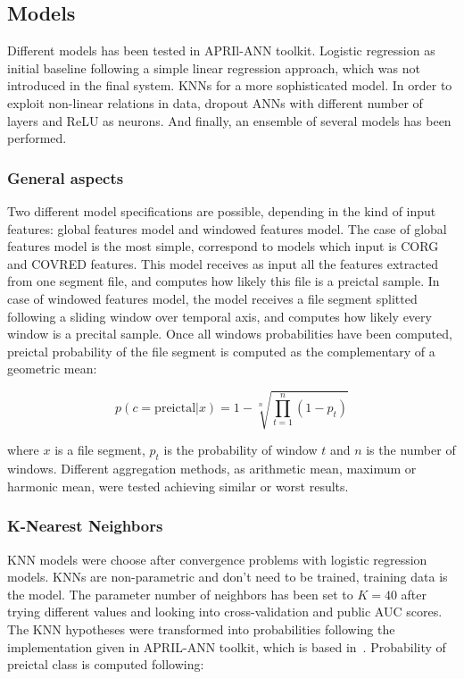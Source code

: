 \documentclass[a4paper,english,twoside]{article}
\begin{document}
\subsection{Models}\label{models}

Different models has been tested in APRIl-ANN toolkit. Logistic regression as
initial baseline following a simple linear regression approach, which was not
introduced in the final system. KNNs for a more sophisticated model. In order to
exploit non-linear relations in data, dropout ANNs with different number of
layers and ReLU as neurons. And finally, an ensemble of several models has been
performed.

\subsubsection{General aspects}

Two different model specifications are possible, depending in the kind of input
features: global features model and windowed features model. The case of global
features model is the most simple, correspond to models which input is CORG and
COVRED features. This model receives as input all the features extracted from
one segment file, and computes how likely this file is a preictal sample. In
case of windowed features model, the model receives a file segment splitted
following a sliding window over temporal axis, and computes how likely every
window is a precital sample. Once all windows probabilities have been computed,
preictal probability of the file segment is computed as the complementary of a
geometric mean:

\begin{equation}
p(c=\text{preictal} | x) = 1 - \sqrt[n]{\prod_{t=1}^n (1 - p_t)}
\label{eq:gmean}
\end{equation}

\noindent where $x$ is a file segment, $p_t$ is the probability of window $t$
and $n$ is the number of windows. Different aggregation methods, as arithmetic
mean, maximum or harmonic mean, were tested achieving similar or worst results.

\subsubsection{K-Nearest Neighbors}\label{k-nearest-neighbors}

KNN models were choose after convergence problems with logistic regression
models. KNNs are non-parametric and don't need to be trained, training data is
the model. The parameter number of neighbors has been set to $K=40$ after trying
different values and looking into cross-validation and public AUC scores. The
KNN hypotheses were transformed into probabilities following the implementation
given in APRIL-ANN toolkit, which is based
in~\cite{2005:nips:hinton:NCA}. Probability of preictal class is computed
following:
\end{document}
